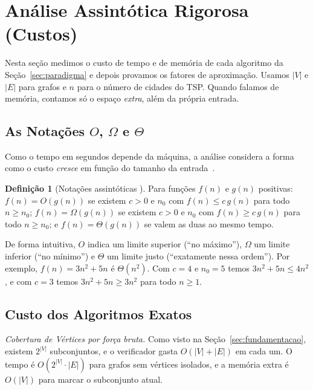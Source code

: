 \documentclass[conference]{IEEEtran}
\theoremstyle{definition}
\newtheorem{definicao}{Definição}
\theoremstyle{plain}
\begin{document}
\section{Análise Assintótica Rigorosa (Custos)}
\label{sec:analise}

Nesta seção medimos o custo de tempo e de memória de cada algoritmo da Seção~\ref{sec:paradigma} e depois provamos os fatores de aproximação. Usamos $|V|$ e $|E|$ para grafos e $n$ para o número de cidades do TSP. Quando falamos de memória, contamos só o espaço \textit{extra}, além da própria entrada.

\subsection{As Notações $O$, $\Omega$ e $\Theta$}

Como o tempo em segundos depende da máquina, a análise considera a forma como o custo \textit{cresce} em função do tamanho da entrada~\cite{cormen2012algoritmos}.

\begin{definicao}[Notações assintóticas \cite{cormen2012algoritmos}]
Para funções $f(n)$ e $g(n)$ positivas:
$f(n) = O(g(n))$ se existem $c > 0$ e $n_0$ com $f(n) \le c\,g(n)$ para todo $n \ge n_0$;
$f(n) = \Omega(g(n))$ se existem $c > 0$ e $n_0$ com $f(n) \ge c\,g(n)$ para todo $n \ge n_0$;
e $f(n) = \Theta(g(n))$ se valem as duas ao mesmo tempo.
\end{definicao}

De forma intuitiva, $O$ indica um limite superior (``no máximo''), $\Omega$ um limite inferior (``no mínimo'') e $\Theta$ um limite justo (``exatamente nessa ordem''). Por exemplo, $f(n) = 3n^2 + 5n$ é $\Theta(n^2)$. Com $c = 4$ e $n_0 = 5$ temos $3n^2 + 5n \le 4n^2$, e com $c = 3$ temos $3n^2 + 5n \ge 3n^2$ para todo $n \ge 1$.

\subsection{Custo dos Algoritmos Exatos}

\textit{Cobertura de Vértices por força bruta.} Como visto na Seção~\ref{sec:fundamentacao}, existem $2^{|V|}$ subconjuntos, e o verificador gasta $O(|V| + |E|)$ em cada um. O tempo é $O(2^{|V|} \cdot |E|)$ para grafos sem vértices isolados, e a memória extra é $O(|V|)$ para marcar o subconjunto atual.
\end{document}

